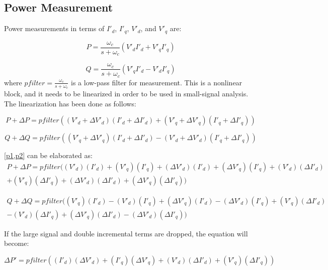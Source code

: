 \subsection{Power Measurement}
Power measurements in terms of $I'_d$, $I'_q$, $V'_d$, and $V'_q$ are:

\begin{equation}
 P=\frac{\omega_c}{s+\omega_c}(V'_dI'_d+V'_qI'_q)
\end{equation}

\begin{equation}
 Q=\frac{\omega_c}{s+\omega_c}(V'_qI'_d-V'_dI'_q)
\end{equation}
where $pfilter=\frac{\omega_c}{s+\omega_c}$ is a low-pass filter for measurement. This is a nonlinear block, and it needs to be linearized in order to be used in small-signal analysis. The linearization has been done as follows:

\begin{equation}\label{p1}
 P+\Delta P=pfilter((V'_d+\Delta V'_d)(I'_d+\Delta I'_d)+(V'_q+\Delta V'_q)(I'_q+\Delta I'_q))
\end{equation}

\begin{equation}\label{p2}
 Q+\Delta Q=pfilter((V'_q+\Delta V'_q)(I'_d+\Delta I'_d)-(V'_d+\Delta V'_d)(I'_q+\Delta I'_q))
\end{equation}

\cref{p1,p2} can be elaborated as:
\begin{equation}
\begin{split}
 P+\Delta P=pfilter((V'_d)(I'_d)+(V'_q)(I'_q)+(\Delta V'_d)(I'_d)+(\Delta V'_q)(I'_q)+(V'_d)(\Delta I'_d)\\+(V'_q)(\Delta I'_q)+(\Delta V'_d)(\Delta I'_d)+(\Delta V'_q)(\Delta I'_q))
 \end{split}
\end{equation}

\begin{equation}
\begin{split}
  Q+\Delta Q=pfilter((V'_q)(I'_d)-(V'_d)(I'_q)+(\Delta V'_q)(I'_d)-(\Delta V'_d)(I'_q)+(V'_q)(\Delta I'_d)\\-(V'_d)(\Delta I'_q)+(\Delta V'_q)(\Delta I'_d)-(\Delta V'_d)(\Delta I'_q))
   \end{split}
\end{equation}

If the large signal and double incremental terms are dropped, the equation will become:

\begin{equation}
 \Delta P' =pfilter((I'_d)(\Delta V'_d)+(I'_q)(\Delta V'_q)+(V'_d)(\Delta I'_d)+(V'_q)(\Delta I'_q))
\end{equation}

